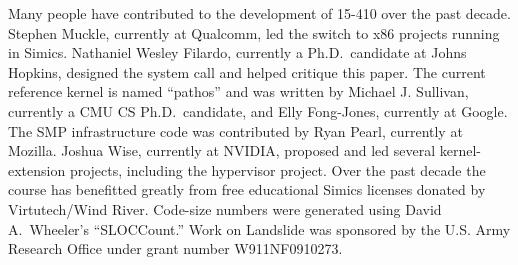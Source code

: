 Many people have contributed to the development of
15-410 over the past decade.
Stephen Muckle, currently at Qualcomm, led
the switch to x86 projects running in Simics.
Nathaniel Wesley Filardo,
currently a Ph.D.\ candidate at Johns Hopkins,
designed the  system call and helped critique this paper.
The current reference kernel is named ``pathos''
and was written by Michael J. Sullivan,
currently a CMU CS Ph.D.\ candidate,
and Elly Fong-Jones, currently at Google.
The SMP infrastructure code was contributed by
Ryan Pearl, currently at Mozilla.
Joshua Wise, currently at NVIDIA,
proposed and led several kernel-extension projects,
including the hypervisor project.
Over the past decade the course has benefitted
greatly from free educational Simics licenses
donated by Virtutech/Wind River.
Code-size numbers were generated using David A.\ Wheeler's
``SLOCCount.''
Work on Landslide was sponsored by the U.S. Army Research Office under grant number W911NF0910273.
